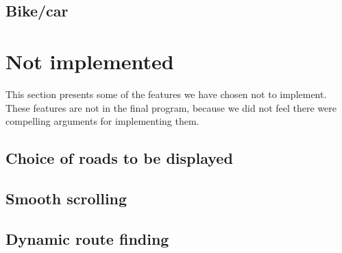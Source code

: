 \subsection{Bike/car}
\label{UIA-IF-BC}

\section{Not implemented}
\label{UIA-NF}
This section presents some of the features we have chosen not to implement.
These features are not in the final program, because we did not feel there were
compelling arguments for implementing them.
\subsection{Choice of roads to be displayed}
\label{UIA-NF-CRD}
\subsection{Smooth scrolling}
\label{UIA-NF-SS}
\subsection{Dynamic route finding}
\label{UIA-NF-DRF}